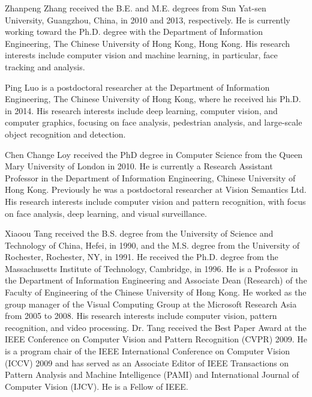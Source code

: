 \documentclass[10pt,journal,compsoc]{IEEEtran}
\begin{document}
\vskip -0.3cm





\begin{IEEEbiography}{Zhanpeng Zhang}
received the B.E. and M.E. degrees from Sun Yat-sen University, Guangzhou, China, in 2010 and 2013, respectively. He is currently working toward the Ph.D. degree with the Department of Information Engineering, The Chinese University of Hong Kong, Hong Kong. His research interests include computer vision and machine learning, in particular, face tracking and analysis.
\end{IEEEbiography}

\begin{IEEEbiography}{Ping Luo} is a postdoctoral researcher at the Department of Information Engineering, The Chinese University of Hong Kong, where he received his Ph.D. in 2014. His research interests include deep learning, computer vision, and computer graphics, focusing on face analysis, pedestrian analysis, and large-scale object recognition and detection.
\end{IEEEbiography}



\begin{IEEEbiography}{Chen Change Loy}
received the PhD degree in Computer Science from the Queen Mary University of London in 2010. He is currently a Research Assistant Professor in the Department of Information Engineering, Chinese University of Hong Kong. Previously he was a postdoctoral researcher at Vision Semantics Ltd. His research interests include computer vision and pattern recognition, with focus on face analysis, deep learning, and visual surveillance.
\end{IEEEbiography}

\begin{IEEEbiography}{Xiaoou Tang}
received the B.S. degree from the University of Science and Technology of China, Hefei, in 1990, and the  M.S. degree from the University of Rochester, Rochester, NY, in  1991. He received the Ph.D. degree from the Massachusetts Institute of Technology, Cambridge, in 1996. He is a Professor in the Department of Information Engineering and Associate Dean (Research) of the Faculty of Engineering of the Chinese University of Hong Kong. He worked as the group manager of the Visual Computing Group at the Microsoft Research Asia from 2005 to 2008. His research interests include computer vision, pattern recognition, and video processing. Dr. Tang received the Best Paper Award at the IEEE Conference on Computer Vision and Pattern Recognition (CVPR) 2009. He is a program chair of the IEEE International Conference on Computer Vision (ICCV) 2009 and has served as an Associate Editor of IEEE Transactions on Pattern Analysis and Machine Intelligence (PAMI) and International Journal of Computer Vision (IJCV). He is a Fellow of IEEE.
\end{IEEEbiography}
\end{document}
